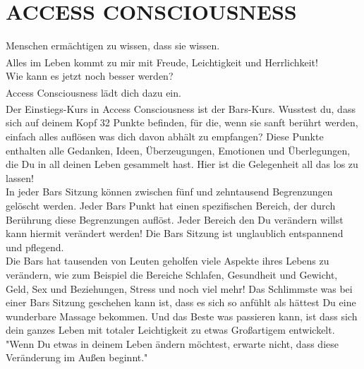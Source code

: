 \documentclass[10pt,foldmark,notumble]{leaflet}
\begin{document}
\newpage
\section{ACCESS CONSCIOUSNESS \textsuperscript{\textregistered}}

\begin{flushleft}
Menschen ermächtigen zu wissen, dass sie wissen.\\
\vspace*{4mm}
Alles im Leben kommt zu mir mit Freude, Leichtigkeit und Herrlichkeit!\textsuperscript{\textregistered}\\
\vspace*{4mm}
Wie kann es jetzt noch besser werden? \\
\vspace*{4mm}
Access Consciousness\textsuperscript{\textregistered} lädt dich dazu ein. \\
\vspace*{4mm}
Der Einstiegs-Kurs in Access Consciousness\textsuperscript{\textregistered} ist der Bars-Kurs. Wusstest du, dass sich auf deinem Kopf 32 Punkte befinden, für die, wenn sie sanft berührt werden, einfach alles auflösen was dich davon abhält zu empfangen? Diese Punkte enthalten alle Gedanken, Ideen, Überzeugungen, Emotionen und Überlegungen, die Du in all deinen Leben gesammelt hast. Hier ist die Gelegenheit all das los zu lassen!\\
\vspace*{4mm}
In jeder Bars Sitzung können zwischen fünf und zehntausend Begrenzungen gelöscht werden. Jeder Bars Punkt hat einen spezifischen Bereich, der durch Berührung diese Begrenzungen auflöst. Jeder Bereich den Du verändern willst kann hiermit verändert werden! Die Bars Sitzung ist unglaublich entspannend und pflegend.\\
\vspace*{4mm}
Die Bars hat tausenden von Leuten geholfen viele Aspekte ihres Lebens zu verändern, wie zum Beispiel die Bereiche Schlafen, Gesundheit und Gewicht, Geld, Sex und Beziehungen, Stress und noch viel mehr! Das Schlimmste was bei einer Bars Sitzung geschehen kann ist, dass es sich so anfühlt als hättest Du eine wunderbare Massage bekommen. Und das Beste was passieren kann, ist dass sich dein ganzes Leben mit totaler Leichtigkeit zu etwas Großartigem entwickelt.\\
\vspace*{4mm}
"Wenn Du etwas in deinem Leben ändern möchtest, erwarte nicht, dass diese Veränderung im Außen beginnt."\\
\end{flushleft}
\end{document}
